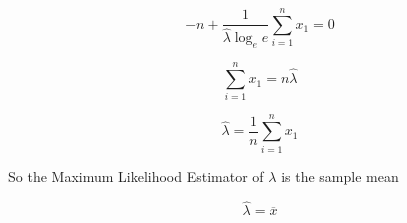 \documentclass{article}
\begin{document}
\begin{equation}
-n+\frac{1}{\widehat{\lambda}\log_e e}\sum_{i=1}^n x_1=0\nonumber
\end{equation}

\begin{equation}
\sum_{i=1}^n x_1=n\widehat{\lambda}\nonumber
\end{equation}

\begin{equation}
\widehat{\lambda}=\frac{1}{n}\sum_{i=1}^n x_1\nonumber
\end{equation}

\noindent So the Maximum Likelihood Estimator of $\lambda$ is the sample mean

\begin{equation}
\widehat{\lambda}=\overline{x}\nonumber
\end{equation}
\end{document}
